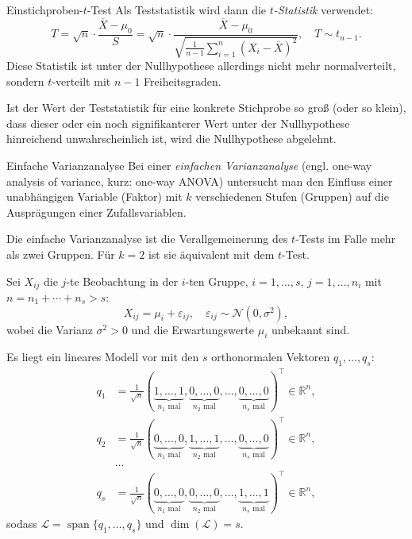 \begin{defi}{Einstichproben-$t$-Test}
    Als Teststatistik wird dann die \emph{$t$-Statistik} verwendet:
    \[
        T = \sqrt{n} \cdot \frac{\overline{X} - \mu_0}{S} = \sqrt{n} \cdot \frac{\overline{X} - \mu_0}{\sqrt{\frac{1}{n - 1} \sum_{i = 1}^{n} (X_i - \overline{X})^2}}, \quad T \sim t_{n - 1}.
    \]
    Diese Statistik ist unter der Nullhypothese allerdings nicht mehr normalverteilt, sondern $t$-verteilt mit $n - 1$ Freiheitsgraden.

    Ist der Wert der Teststatistik für eine konkrete Stichprobe so groß (oder so klein), dass dieser oder ein noch signifikanterer Wert unter der Nullhypothese hinreichend unwahrscheinlich ist, wird die Nullhypothese abgelehnt.
\end{defi}

\begin{defi}{Einfache Varianzanalyse}
    Bei einer \emph{einfachen Varianzanalyse} (engl. one-way analysis of variance, kurz: one-way ANOVA) untersucht man den Einfluss einer unabhängigen Variable (Faktor) mit $k$ verschiedenen Stufen (Gruppen) auf die Ausprägungen einer Zufallsvariablen.

    Die einfache Varianzanalyse ist die Verallgemeinerung des $t$-Tests im Falle mehr als zwei Gruppen.
    Für $k = 2$ ist sie äquivalent mit dem $t$-Test.

    Sei $X_{ij}$ die $j$-te Beobachtung in der $i$-ten Gruppe, $i = 1, \ldots, s$, $j = 1, \ldots, n_i$ mit $n = n_1 + \dotsb + n_s > s$:
    \[
        X_{ij} = \mu_i + \varepsilon_{ij}, \quad \varepsilon_{ij} \sim \mathcal{N}(0, \sigma^2),
    \]
    wobei die Varianz $\sigma^2 > 0$ und die Erwartungswerte $\mu_i$ unbekannt sind.

    Es liegt ein lineares Modell vor mit den $s$ orthonormalen Vektoren $q_1, \ldots, q_s$:
    \begin{align*}
        q_1 & = \frac{1}{\sqrt{n}} ( \underbrace{1, \ldots, 1}_{n_1 \text{ mal}}, \underbrace{0, \ldots, 0}_{n_2 \text{ mal}}, \ldots, \underbrace{0, \ldots, 0}_{n_s \text{ mal}} )^{\top} \in \mathbb{R}^n, \\
        q_2 & = \frac{1}{\sqrt{n}} ( \underbrace{0, \ldots, 0}_{n_1 \text{ mal}}, \underbrace{1, \ldots, 1}_{n_2 \text{ mal}}, \ldots, \underbrace{0, \ldots, 0}_{n_s \text{ mal}} )^{\top} \in \mathbb{R}^n, \\
            & \ldots                                                                                                                                                                                          \\
        q_s & = \frac{1}{\sqrt{n}} ( \underbrace{0, \ldots, 0}_{n_1 \text{ mal}}, \underbrace{0, \ldots, 0}_{n_2 \text{ mal}}, \ldots, \underbrace{1, \ldots, 1}_{n_s \text{ mal}} )^{\top} \in \mathbb{R}^n,
    \end{align*}
    sodass $\mathcal{L} = \operatorname{span} \{ q_1, \ldots, q_s \}$ und $\dim(\mathcal{L}) = s$.


\end{defi}

